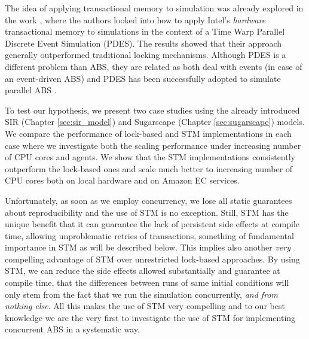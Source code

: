 The idea of applying transactional memory to simulation was already explored in the work \cite{hay_experiments_2015}, where the authors looked into how to apply Intel’s \textit{hardware} transactional memory to simulations in the context of a Time Warp Parallel Discrete Event Simulation (PDES). The results showed that their approach generally outperformed traditional locking mechanisms. Although PDES is a different problem than ABS, they are related as both deal with events (in case of an event-driven ABS) and PDES has been successfully adopted to simulate parallel ABS \cite{suryanarayanan_pdes-mas_2013}.

To test our hypothesis, we present two case studies using the already introduced SIR (Chapter \ref{sec:sir_model}) and Sugarscape (Chapter \ref{sec:sugarscape}) models. We compare the performance of lock-based and STM implementations in each case where we investigate both the scaling performance under increasing number of CPU cores and agents. We show that the STM implementations consistently outperform the lock-based ones and scale much better to increasing number of CPU cores both on local hardware and on Amazon EC services.

Unfortunately, as soon as we employ concurrency, we lose all static guarantees about reproducibility and the use of STM is no exception. Still, STM has the unique benefit that it can guarantee the lack of persistent side effects at compile time, allowing unproblematic retries of transactions, something of fundamental importance in STM as will be described below. This implies also another \textit{very} compelling advantage of STM over unrestricted lock-based approaches. By using STM, we can reduce the side effects allowed substantially and guarantee at compile time, that the differences between runs of same initial conditions will only stem from the fact that we run the simulation concurrently, \textit{and from nothing else}. All this makes the use of STM very compelling and to our best knowledge we are the very first to investigate the use of STM for implementing concurrent ABS in a systematic way.











